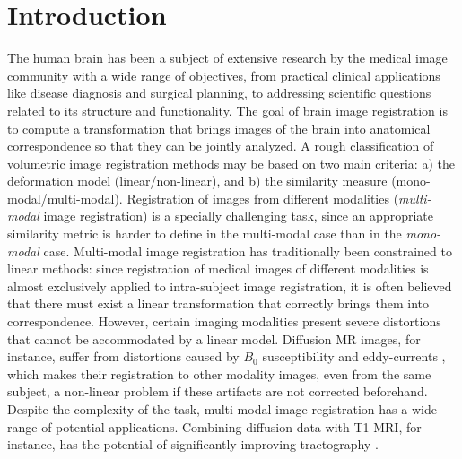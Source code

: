 \section{Introduction}
The human brain has been a subject of extensive research by the medical image community with a wide range of objectives, from practical clinical applications like disease diagnosis and surgical planning, to addressing scientific questions related to its structure and functionality. The goal of brain image registration is to compute a transformation that brings images of the brain into anatomical correspondence so that they can be jointly analyzed. A rough classification of volumetric image registration methods may be based on two main criteria: a) the deformation model (linear/non-linear), and b) the similarity measure (mono-modal/multi-modal). Registration of images from different modalities (\emph{multi-modal} image registration) is a specially challenging task, since an appropriate similarity metric is harder to define in the multi-modal case than in the \emph{mono-modal} case. Multi-modal image registration has traditionally been constrained to linear methods: since registration of medical images of different modalities is almost exclusively applied to intra-subject image registration, it is often believed that there must exist a linear transformation that correctly brings them into correspondence. However, certain imaging modalities present severe distortions that cannot be accommodated by a linear model. Diffusion MR images, for instance, suffer from distortions caused by $B_{0}$ susceptibility and eddy-currents \citep{Tournier2011, Andersson2003}, which makes their registration to other modality images, even from the same subject, a non-linear problem if these artifacts are not corrected beforehand. Despite the complexity of the task, multi-modal image registration has a wide range of potential applications. Combining diffusion data with T1 MRI, for instance, has the potential of significantly improving tractography \citep{Smith2012, Girard2014}.\\

